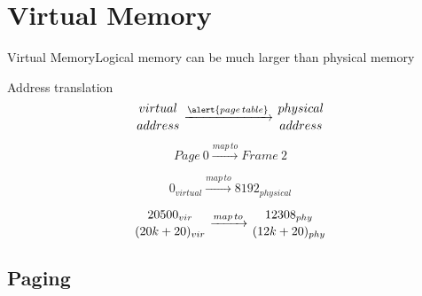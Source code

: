 \section{Virtual Memory}

\begin{frame}{Virtual Memory}{Logical memory can be much larger than physical memory}
  \begin{varwidth}{.48\textwidth}
    \begin{center}
    \end{center}
  \end{varwidth}\hfill
  \begin{varwidth}{.48\textwidth}
    \begin{block}{Address translation}
      $$\genfrac{}{}{0pt}{}{virtual}{address}
      \xrightarrow{\alert{page\,table}}
      \genfrac{}{}{0pt}{}{physical}{address}$$
      
      $$Page\ 0\xrightarrow{map\,to}Frame\ 2$$
      
      $$0_{virtual}\xrightarrow{map\,to}8192_{physical}$$
      
      $$\genfrac{}{}{0pt}{}{20500_{vir}}{(20k+20)_{vir}}
      \xrightarrow{map\,to} \genfrac{}{}{0pt}{}{12308_{phy}}{(12k+20)_{phy}}$$
    \end{block}
  \end{varwidth}
\end{frame}


\subsection{Paging}

